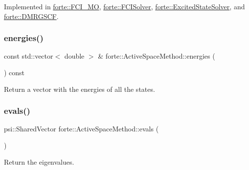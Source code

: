 Implemented in \mbox{\hyperlink{classforte_1_1_f_c_i___m_o_a98d9b947e1cf345c82d513a54ca51ddd}{forte\+::\+F\+C\+I\+\_\+\+MO}}, \mbox{\hyperlink{classforte_1_1_f_c_i_solver_a5ea02e6826ffd8eb01fd25c229517159}{forte\+::\+F\+C\+I\+Solver}}, \mbox{\hyperlink{classforte_1_1_excited_state_solver_a35b840324fb9e080eda46f29e544c86a}{forte\+::\+Excited\+State\+Solver}}, and \mbox{\hyperlink{classforte_1_1_d_m_r_g_s_c_f_a19128db2df6992b295bd00d85c43309d}{forte\+::\+D\+M\+R\+G\+S\+CF}}.

\mbox{\label{classforte_1_1_active_space_method_a9fdd240d326fab5791b58278af2a69bf}} 
\subsubsection{\texorpdfstring{energies()}{energies()}}
{\footnotesize\ttfamily const std\+::vector$<$ double $>$ \& forte\+::\+Active\+Space\+Method\+::energies (\begin{DoxyParamCaption}{ }\end{DoxyParamCaption}) const}



Return a vector with the energies of all the states. 

\mbox{\label{classforte_1_1_active_space_method_a4991f2ecd42e6a1c89a5c607b4815b47}} 
\subsubsection{\texorpdfstring{evals()}{evals()}}
{\footnotesize\ttfamily psi\+::\+Shared\+Vector forte\+::\+Active\+Space\+Method\+::evals (\begin{DoxyParamCaption}{ }\end{DoxyParamCaption})}



Return the eigenvalues. 

\mbox{\label{classforte_1_1_active_space_method_aa2bafc732bd7023fd32fbd263ef2e903}} 
